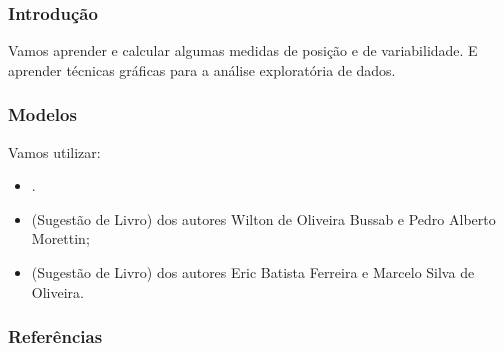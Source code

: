 \documentclass[12pt]{beamer}
\begin{document}
\begin{frame}{}
\frametitle{Introdução}
\begin{block}{}
\justifying
Vamos aprender e calcular algumas medidas de posição e de variabilidade. E aprender técnicas gráficas para a análise exploratória de dados. 
\end{block}
\end{frame}

\begin{frame}{}
\frametitle{Modelos}
\begin{block}{}
\justifying
Vamos utilizar:
\begin{itemize}
    \item {}.
    \item (Sugestão de Livro)  dos autores Wilton de Oliveira Bussab e Pedro Alberto Morettin;
    \item (Sugestão de Livro) 
     dos autores Eric Batista Ferreira e Marcelo Silva de Oliveira.
\end{itemize}
\end{block}
\end{frame}


\begin{frame}[allowframebreaks]
\frametitle{\bf Referências}
\printbibliography
\end{frame}
\end{document}
